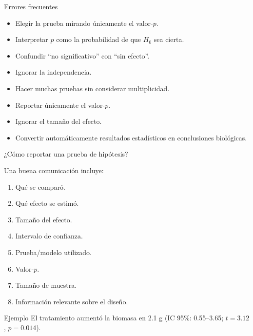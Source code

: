 \documentclass[aspectratio=169,11pt]{beamer}
\begin{document}
\begin{frame}{Errores frecuentes}

\begin{itemize}
    \item Elegir la prueba mirando únicamente el valor-$p$.
    \item Interpretar $p$ como la probabilidad de que $H_0$ sea cierta.
    \item Confundir ``no significativo'' con ``sin efecto''.
    \item Ignorar la independencia.
    \item Hacer muchas pruebas sin considerar multiplicidad.
    \item Reportar únicamente el valor-$p$.
    \item Ignorar el tamaño del efecto.
    \item Convertir automáticamente resultados estadísticos en conclusiones
    biológicas.
\end{itemize}

\end{frame}

\begin{frame}{¿Cómo reportar una prueba de hipótesis?}

Una buena comunicación incluye:

\begin{enumerate}
    \item Qué se comparó.
    \item Qué efecto se estimó.
    \item Tamaño del efecto.
    \item Intervalo de confianza.
    \item Prueba/modelo utilizado.
    \item Valor-$p$.
    \item Tamaño de muestra.
    \item Información relevante sobre el diseño.
\end{enumerate}

\vspace{0.3cm}

\begin{block}{Ejemplo}
El tratamiento aumentó la biomasa en 2.1 g
(IC 95\%: 0.55--3.65; $t=3.12$, $p=0.014$).
\end{block}

\end{frame}
\end{document}
